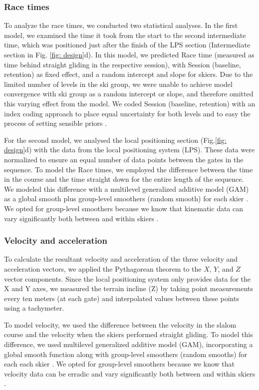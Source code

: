 \documentclass{article}
\begin{document}
\subsubsection{Race times}
To analyze the race times, we conducted two statistical analyses. In the first model, we examined the time it took from the start to the second intermediate time, which was positioned just after the finish of the LPS section (Intermediate section in Fig. \ref{fig: design}d). In this model, we predicted Race time (measured as time behind straight gliding in the respective session), with Session (baseline, retention) as fixed effect, and a random intercept and slope for skiers. Due to the limited number of levels in the ski group, we were unable to achieve model convergence with ski group as a random intercept or slope, and therefore omitted this varying effect from the model. We coded Session (baseline, retention) with an index coding approach to place equal uncertainty for both levels and to easy the process of setting sensible priors \cite{mcelreath_statistical_2018}.

For the second model, we analysed the local positioning section (Fig.\ref{fig: design}d) with the data from the local positioning system (LPS). These data were normalized to ensure an equal number of data points between the gates in the sequence. To model the Race times, we employed the difference between the time in the course and the time straight down for the entire length of the sequence. We modeled this difference with a multilevel generalized additive model (GAM) as a global smooth plus group-level smoothers (random smooth) for each skier \cite{pedersen_hierarchical_2019}. We opted for group-level smoothers because we know that kinematic data can vary significantly both between and within skiers \cite{federolf_quantifying_2012, supej_impact_2015, reid_kinematic_2010}. 

\subsubsection{Velocity and acceleration}
To calculate the resultant velocity and acceleration of the three velocity and acceleration vectors, we applied the Pythagorean theorem to the $X$, $Y$, and $Z$ vector components. Since the local positioning system only provides data for the X and Y axes, we measured the terrain incline (Z) by taking point measurements every ten meters (at each gate) and interpolated values between these points using a tachymeter.

To model velocity, we used the difference between the velocity in the slalom course and the velocity when the skiers performed straight gliding. To model this difference, we used multilevel generalized additive model (GAM), incorporating a global smooth function along with group-level smoothers (random smooths) for each each skier \cite{pedersen_hierarchical_2019}. We opted for group-level smoothers because we know that velocity data can be erradic and vary significantly both between and within skiers \cite{federolf_quantifying_2012, supej_impact_2015, reid_kinematic_2010}. 
\end{document}
